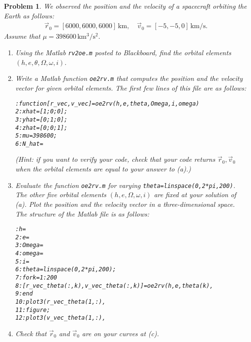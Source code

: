 \documentclass[10pt]{article}
\renewcommand{\baselinestretch}{1.2}
\theoremstyle{plain}\theorembodyfont{\normalfont}
\newtheorem{prob}{Problem}[section]
\newenvironment{subprob}%
{\renewcommand{\theenumi}{\alph{enumi}}\renewcommand{\labelenumi}{(\theenumi)}\begin{enumerate}}%
{\end{enumerate}}%
\newenvironment{matlab}
{\begin{alltt}\small\renewcommand{\baselinestretch}{1.2}\selectfont}%
{\end{alltt}}
\begin{document}
\begin{prob} We observed the position and the velocity of a spacecraft orbiting the Earth as follows:
\begin{align*}
\vec r_0 = [6000,6000,6000]\,\mathrm{km},\quad \vec v_0 = [-5,-5,0]\,\mathrm{km/s}.
\end{align*}
Assume that $\mu = 398600 \,\mathrm{km^3/s^2}$.

\begin{subprob}
\item Using the Matlab \texttt{rv2oe.m} posted to Blackboard, find the orbital elements $(h,e,\theta,\Omega,\omega,i)$.
\item Write a Matlab function \texttt{oe2rv.m} that computes the position and the velocity vector for  given orbital elements. The first few lines of this file are as follows:
\begin{matlab}
1: function [r_vec, v_vec]=oe2rv(h,e,theta,Omega,i,omega)
2: xhat=[1;0;0];
3: yhat=[0;1;0];
4: zhat=[0;0;1];
5: mu=398600;
6: N_hat=
\end{matlab}

(Hint: if you want to verify your code, check that your code returns $\vec r_0,\vec v_0$ when the orbital elements are equal to your answer to (a).)

\item Evaluate the function \texttt{oe2rv.m} for varying \texttt{theta=linspace(0,2*pi,200)}. The other five orbital elements $(h,e,\Omega,\omega,i)$ are fixed at your solution of (a). Plot the position and the velocity vector in a three-dimensional space. The structure of the Matlab file is as follows:
\begin{matlab}
 1: h=
 2: e=
 3: Omega=
 4: omega=
 5: i=
 6: theta=linspace(0,2*pi,200);
 7: for k=1:200
 8:      [r_vec_theta(:,k),v_vec_theta(:,k)]=oe2rv(h,e,theta(k),
 9: end
10: plot3(r_vec_theta(1,:),
11: figure;
12: plot3(v_vec_theta(1,:),
\end{matlab}
\item Check that $\vec r_0$ and $\vec v_0$ are on your curves at (c).
\end{subprob}
\end{prob}
\end{document}
